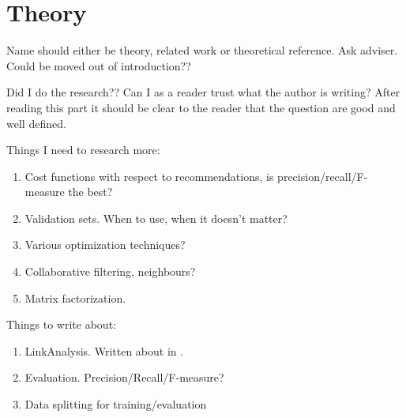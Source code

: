 

\section{Theory}\label{sec:intro:theory}

Name should either be theory, related work or theoretical reference. Ask adviser. Could be moved out of introduction??

Did I do the research?? Can I as a reader trust what the author is writing? After reading this part it should be clear to the reader that the question are good and well defined.

Things I need to research more:

\begin{enumerate}
    \item Cost functions with respect to recommendations, is precision/recall/F-measure the best?
    \item Validation sets. When to use, when it doesn't matter?
    \item Various optimization techniques?
    \item Collaborative filtering, neighbours? \cite{Yifan:2008}
    \item Matrix factorization.
\end{enumerate}

Things to write about:

\begin{enumerate}
    \item LinkAnalysis. Written about in \cite{Zan:2007}.
    \item Evaluation. Precision/Recall/F-measure?
    \item Data splitting for training/evaluation
\end{enumerate}

